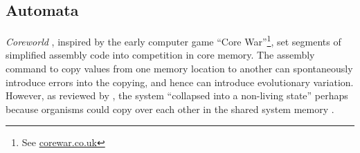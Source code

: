 %
%
%
%
%
%
%
%
%
%
\subsection{Automata}

\emph{Coreworld} \parencite{Rasmussen1990}, inspired by the early computer game ``Core War''\footnote{See \url{corewar.co.uk}}, set segments of simplified assembly code into competition in core memory. The assembly command to copy values from one memory location to another can spontaneously introduce errors into the copying, and hence can introduce evolutionary variation. However, as reviewed by \textcite{Ofria2004}, the system ``collapsed into a non-living state'' perhaps because organisms could copy over each other in the shared system memory \parencite{Ofria2004}.


